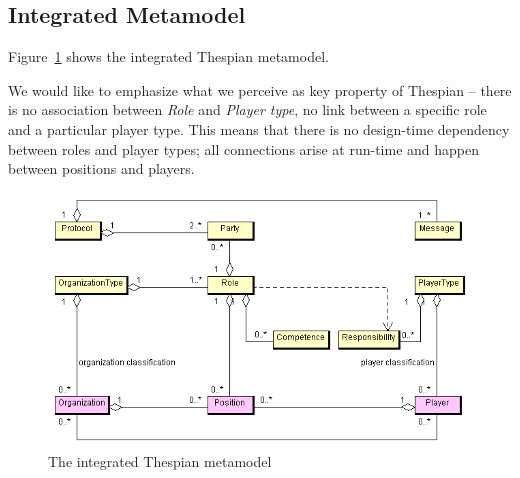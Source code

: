 \subsection{Integrated Metamodel}

Figure~\ref{figure:thespian-integrated-metamodel} shows the integrated Thespian metamodel.

We would like to emphasize what we perceive as key property of Thespian -- there is no association between \textit{Role} and \textit{Player type}, no link between a specific role and a particular player type.
This means that there is no design-time dependency between roles and player types; all connections arise at run-time and happen between positions and players.

\begin{figure}[ht]
	\centering
	\includegraphics[width=\textwidth]{images/thespian/thespian-metamodel.png}
	\caption{The integrated Thespian metamodel}
	\label{figure:thespian-integrated-metamodel}
\end{figure}